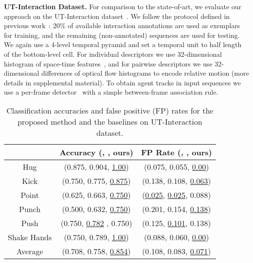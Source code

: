 

\vspace{0.05in}\noindent\noindent\textbf{UT-Interaction Dataset.} For comparison to the state-of-art, we evaluate our approach on the UT-Interaction dataset~\cite{Ryoo:group}. We follow the protocol defined in previous work~\cite{Ryoo:group,Amer:group}: 20\% of available interaction annotations are used as exemplars for training, and the remaining (non-annotated) sequences are used for testing. We again use a 4-level temporal pyramid and set a temporal unit to half length of the bottom-level cell. For individual descriptors we use 32-dimensional histogram of space-time features~\cite{Dollar:STIP}, and for pairwise descriptors we use 32-dimensional differences of optical flow histograms to encode relative motion (more details in supplemental material). To obtain agent tracks in input sequences we use a per-frame detector~\cite{Pedro:detect} with a simple between-frame association rule.

\begin{table}[ht]
\centering \caption{Classification accuracies and false positive (FP) rates for the proposed method and the baselines on UT-Interaction dataset.}
\footnotesize{
\begin{tabular}{|c||c|c|}
\hline   & Accuracy (\cite{Ryoo:group}, \cite{Amer:group}, ours) & FP Rate (\cite{Ryoo:group}, \cite{Amer:group}, ours) \\
\hline Hug &  (0.875, 0.904, \underline{1.00}) & (0.075, 0.055, \underline{0.00}) \\
\hline Kick &  (0.750, 0.775, \underline{0.875})  & (0.138, 0.108, \underline{0.063})\\
\hline Point & (0.625, 0.663,  \underline{0.750}) & (\underline{0.025}, \underline{0.025}, 0.088)\\
\hline Punch & (0.500, 0.632, \underline{0.750})  & (0.201, 0.154,  \underline{0.138})\\
\hline Push & (0.750, \underline{0.782} , 0.750)  & (0.125, \underline{0.101},  0.138)\\
\hline Shake Hands &  (0.750, 0.789, \underline{1.00}) & (0.088, 0.060, \underline{0.00}) \\
\hline\hline Average &  (0.708, 0.758, \underline{0.854})  & (0.108, 0.083,  \underline{0.071})\\
\hline 
\end{tabular}
}
\label{UTaccuFP}
\end{table}

